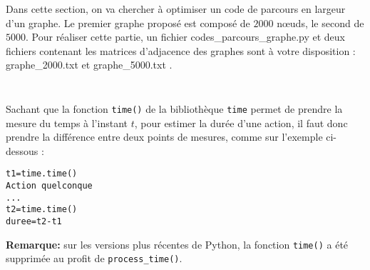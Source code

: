 Dans cette section, on va chercher à optimiser un code de parcours en largeur d'un graphe. Le premier graphe proposé est composé de $2000$ n\oe{}uds, le second de $5000$. Pour réaliser cette partie, un fichier \og codes\_parcours\_graphe.py \fg{} et deux fichiers contenant les matrices d'adjacence des graphes sont à votre disposition : \og graphe\_2000.txt \fg{} et  \og graphe\_5000.txt \fg{}.\\

\ifprof
\begin{corrige}
\begin{lstlisting}

\end{lstlisting}
\end{corrige}
\else
\fi

\ifprof
\begin{corrige}
\begin{lstlisting}

\end{lstlisting}
\end{corrige}
\else
\fi

Sachant que la fonction \texttt{time()} de la bibliothèque \texttt{time} permet de prendre la mesure du temps à l'instant $t$, pour estimer la durée d'une action, il faut donc prendre la différence entre deux points de mesures, comme sur l'exemple ci-dessous :
\begin{lstlisting}
t1=time.time()
Action quelconque
...
t2=time.time()
duree=t2-t1
 \end{lstlisting}
 
\textbf{Remarque:} sur les versions plus récentes de Python, la fonction \texttt{time()} a été supprimée au profit de \texttt{process\_time()}.\\

\ifprof
\begin{corrige}
\begin{lstlisting}

\end{lstlisting}
\end{corrige}
\else
\fi

